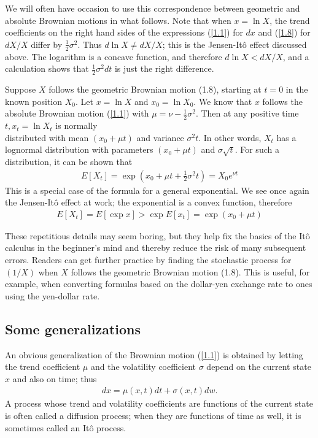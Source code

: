 \documentclass[12pt]{article}
\theoremstyle{definition}
\begin{document}
We will often have occasion to use this correspondence between geometric and absolute Brownian motions in what follows. Note that when $x=\ln X$, the trend coefficients on the right hand sides of the expressions (\ref{1.1}) for $d x$ and (\ref{1.8}) for $d X / X$ differ by $\frac{1}{2} \sigma^{2}$. Thus $d \ln X \neq d X / X$; this is the Jensen-Itô effect discussed above. The logarithm is a concave function, and therefore $d \ln X<d X / X$, and a calculation shows that $\frac{1}{2} \sigma^{2} d t$ is just the right difference.

Suppose $X$ follows the geometric Brownian motion (1.8), starting at $t=0$ in the known position $X_{0}$. Let $x=\ln X$ and $x_{0}=\ln X_{0}$. We know that $x$ follows the absolute Brownian motion (\ref{1.1}) with $\mu=\nu-\frac{1}{2} \sigma^{2}$. Then at any positive time $t, x_{t}=\ln X_{t}$ is normally\\
distributed with mean $\left(x_{0}+\mu t\right)$ and variance $\sigma^{2} t$. In other words, $X_{t}$ has a lognormal distribution with parameters $\left(x_{0}+\mu t\right)$ and $\sigma \sqrt{t}$. For such a distribution, it can be shown that
\begin{align*}
E\left[X_{t}\right]=\exp \left(x_{0}+\mu t+\frac{1}{2} \sigma^{2} t\right)=X_{0} e^{\nu t}
\end{align*}
This is a special case of the formula for a general exponential. We see once again the Jensen-Itô effect at work; the exponential is a convex function, therefore
\begin{align*}
E\left[X_{t}\right]=E[\exp x]>\exp E\left[x_{t}\right]=\exp \left(x_{0}+\mu t\right)
\end{align*}

These repetitious details may seem boring, but they help fix the basics of the Itô calculus in the beginner's mind and thereby reduce the risk of many subsequent errors. Readers can get further practice by finding the stochastic process for $(1 / X)$ when $X$ follows the geometric Brownian motion (1.8). This is useful, for example, when converting formulas based on the dollar-yen exchange rate to ones using the yen-dollar rate.

\subsection{Some generalizations}
An obvious generalization of the Brownian motion (\ref{1.1}) is obtained by letting the trend coefficient $\mu$ and the volatility coefficient $\sigma$ depend on the current state $x$ and also on time; thus
\begin{align}
d x=\mu(x, t) d t+\sigma(x, t) d w . \label{1.9}
\end{align}
A process whose trend and volatility coefficients are functions of the current state is often called a diffusion process; when they are functions of time as well, it is sometimes called an Itô process.
\end{document}
